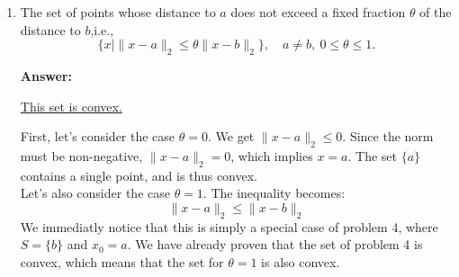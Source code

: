 \documentclass[11pt,a4paper]{article}
\newenvironment{solution}{
  \par\noindent\textbf{Answer:}\vspace{0.3em}
}{\vspace{1em}}
\begin{document}
\begin{enumerate}
\item The set of points whose distance to $a$ does not exceed a fixed fraction $\theta$ of the distance to $b$,i.e.,
\[
    \{ x \mid \| x - a \|_2 \leq \theta \| x - b \|_2 \}, \quad a \neq b,\ 0 \leq \theta \leq 1.
\]

\begin{solution}
    \underline{This set is convex.}

    First, let's consider the case $\theta = 0$. We get $\| x - a \|_2 \leq 0$. Since the norm must be non-negative, $\|x-a\|_2 = 0$, which implies $x=a$. The set $\{a\}$ contains a single point, and is thus convex.\\

    
    Let's also consider the case $\theta=1$. The inequality becomes:
    \[
        \|x-a\|_2 \leq \|x-b\|_2
    \]
    We immediatly notice that this is simply a special case of problem 4, where $S = \{b\}$ and $x_0 = a$. We have already proven that the set of problem 4 is convex, which means that the set for $\theta=1$ is also convex.\\


\end{solution}
\end{enumerate}
\end{document}
